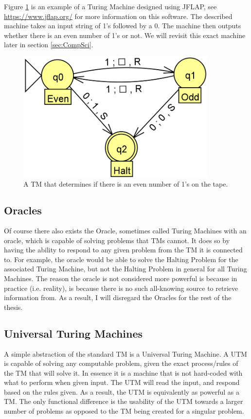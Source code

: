 Figure \ref{Fig:TM} is an example of a Turing Machine designed using JFLAP, see \href{https://www.jflap.org/}{https://www.jflap.org/} for more information on this software.
The described machine takes an input string of 1's followed by a 0.
The machine then outputs whether there is an even number of 1's or not.
We will revisit this exact machine later in section \ref{sec:CompSci}.

\begin{figure}[htb]
    \centering
    \includegraphics[width=10cm]{Images/SampleTMCrop.png}
       \caption{A TM that determines if there is an even number of 1's on the tape.}
           \label{Fig:TM}
\end{figure}

\subsection{Oracles}\label{subsec:Oracles}

Of course there also exists the Oracle, sometimes called Turing Machines with an oracle, which is capable of solving problems that TMs cannot.
It does so by having the ability to respond to any given problem from the TM it is connected to.
For example, the oracle would be able to solve the Halting Problem for the associated Turing Machine, but not the Halting Problem in general for all Turing Machines.
The reason the oracle is not considered more powerful is because in practice (i.e. reality), is because there is no such all-knowing source to retrieve information from.
As a result, I will disregard the Oracles for the rest of the thesis.

\subsection{Universal Turing Machines}\label{subsec:UTM}

A simple abstraction of the standard TM is a Universal Turing Machine. A UTM is capable of solving any computable problem, given the exact process/rules of the TM that will solve it.
In essence it is a machine that is not hard-coded with what to perform when given input.
The UTM will read the input, and respond based on the rules given.
As a result, the UTM is equivalently as powerful as a TM.
The only functional difference is the usability of the UTM towards a larger number of problems as opposed to the TM being created for a singular problem.


